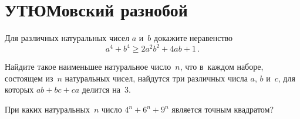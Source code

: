 
\section*{УТЮМовский разнобой}


\begin{problems}

\item
Для различных натуральных чисел $a$ и~$b$ докажите неравенство\enspace
\[
    a^4 + b^4
\geq
    2 a^2 b^2 + 4 a b + 1
\, . \]

\item
Найдите такое наименьшее натуральное число~$n$, что в~каждом наборе, состоящем
из~$n$ натуральных чисел, найдутся три различных числа $a$, $b$ и~$c$, для
которых $a b + b c + c a$ делится на~3.


\item
При каких натуральных~$n$ число $4^{n} + 6^{n} + 9^{n}$ является точным
квадратом?


\end{problems}
